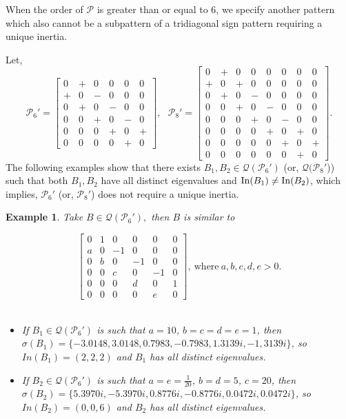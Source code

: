 \documentclass[a4paper, 10pt]{article}
\newtheorem{eg}{Example}[section]
\numberwithin{equation}{section}
\def\In{{\rm In}}
\begin{document}
When the order of $\mathcal{P}$ is greater than or equal to $6$, we specify another pattern which also cannot be a subpattern of a tridiagonal sign pattern requiring a unique inertia.





Let, $$\mathcal{P}_6'=\begin{bmatrix}
	0&+&0&0&0&0\\+&0&-&0&0&0\\0&+&0&-&0&0\\0&0&+&0&-&0\\0&0&0&+&0&+\\0&0&0&0&+&0
\end{bmatrix}, ~~~
\mathcal{P}_8'=\begin{bmatrix}
	0&+&0&0&0&0&0&0\\+&0&+&0&0&0&0&0\\0&+&0&-&0&0&0&0\\0&0&+&0&-&0&0&0\\0&0&0&+&0&-&0&0\\0&0&0&0&+&0&+&0\\0&0&0&0&0&+&0&+\\0&0&0&0&0&0&+&0
\end{bmatrix}.$$
The following examples show that there exists $B_1, B_2\in \mathcal{Q}(\mathcal{P}_6')$ (or, $\mathcal{Q}(\mathcal{P}_8'$)) such that both $B_1,B_2$ have all distinct eigenvalues and $\In(B_1)\neq \In(B_2)$, which implies, $\mathcal{P}_6'$ (or, $\mathcal{P}_8'$) does not require a unique inertia.

\begin{eg} \label{ega21} 
	Take $B\in \mathcal{Q}(\mathcal{P}_6'),$ then $B$ is similar to
	
	$$\begin{bmatrix}
		0&1&0&0&0&0\\a&0&-1&0&0&0\\0&b&0&-1&0&0\\0&0&c&0&-1&0\\0&0&0&d&0&1\\0&0&0&0&e&0
	\end{bmatrix}, ~\text{where}~ a,b,c,d,e>0.$$ \\
	
	\begin{itemize}
		\item[i.] If $B_1\in \mathcal{Q}(\mathcal{P}_6')$ is such that $a=10$, $b=c=d=e=1$, then $\sigma(B_1)=\{-3.0148,  3.0148, 0.7983, -0.7983, 1.3139i, -1, 3139i\}$, so $In(B_1)=(2,2,2)$ and $B_1$ has all distinct eigenvalues. 
		\item[ii.] If $B_2\in \mathcal{Q}(\mathcal{P}_6')$ is such that $a=e=\frac{1}{20}$, $b=d=5$, $c=20$, then $\sigma(B_2)=\{ 5.3970i,-5.3970i, 0.8776i, -0.8776i, 0.0472i, 0.0472i\}$, so $In(B_2)=(0,0,6)$ and $B_2$ has all distinct eigenvalues.
	\end{itemize}
\end{eg}
\end{document}
